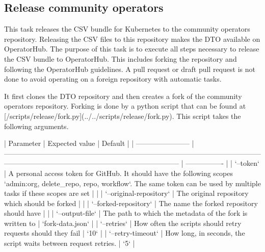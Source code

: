 \subsection{Release community operators}\label{subsec:release-community-operators}

This task releases the CSV bundle for Kubernetes to the community operators repository.
Releasing the CSV files to this repository makes the DTO available on OperatorHub.
The purpose of this task is to execute all steps necessary to release the CSV bundle to OperatorHub.
This includes forking the repository and following the OperatorHub guidelines.
A pull request or draft pull request is not done to avoid operating on a foreign repository with automatic tasks.

It first clones the DTO repository and then creates a fork of the community operators repository.
Forking is done by a python script that can be found at [/scripts/release/fork.py](../../scripts/release/fork.py).
This script takes the following arguments.

| Parameter               | Expected value                                                                                                                                                                         | Default          |
| ----------------------- | -------------------------------------------------------------------------------------------------------------------------------------------------------------------------------------- | ---------------- |
| `--token`               | A personal access token for GitHub. It should have the following scopes `admin:org, delete_repo, repo, workflow`. The same token can be used by multiple tasks if these scopes are set |                  |
| `--original-repository` | The original repository which should be forked                                                                                                                                         |                  |
| `--forked-repository`   | The name the forked repository should have                                                                                                                                             |                  |
| `--output-file`         | The path to which the metadata of the fork is written to                                                                                                                               | `fork-data.json` |
| `--retries`             | How often the scripts should retry requests should they fail                                                                                                                           | `10`             |
| `--retry-timeout`       | How long, in seconds, the script waits between request retries.                                                                                                                        | `5`              |

